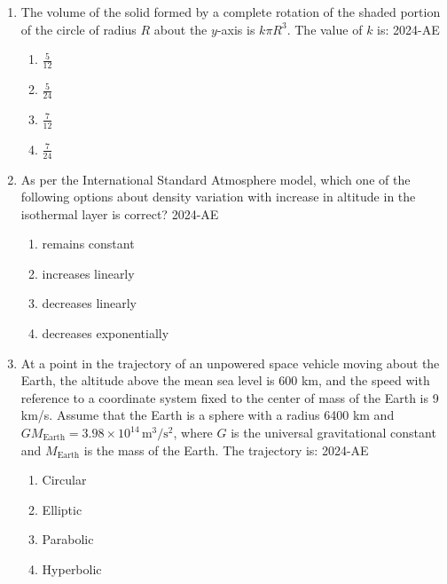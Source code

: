 \documentclass[journal]{IEEEtran}
\begin{document}
\begin{enumerate}
    \item The volume of the solid formed by a complete rotation of the shaded portion of the circle of radius $R$ about the $y$-axis is $k \pi R^3$. The value of $k$ is:
     \hfill{2024-AE}
    \begin{enumerate}
        \item $\frac{5}{12}$
        \item $\frac{5}{24}$
        \item $\frac{7}{12}$
        \item $\frac{7}{24}$
    \end{enumerate}
     \item As per the International Standard Atmosphere model, which one of the following options about density variation with increase in altitude in the isothermal layer is correct?
      \hfill{2024-AE}
    \begin{enumerate}
        \item remains constant
        \item increases linearly
        \item decreases linearly
        \item decreases exponentially
    \end{enumerate}

\item At a point in the trajectory of an unpowered space vehicle moving about the Earth, the altitude above the mean sea level is 600 km, and the speed with reference to a coordinate system fixed to the center of mass of the Earth is 9 km/s. Assume that the Earth is a sphere with a radius 6400 km and $GM_{\text{Earth}} = 3.98 \times 10^{14} \, \text{m}^3/\text{s}^2$, where $G$ is the universal gravitational constant and $M_{\text{Earth}}$ is the mass of the Earth. The trajectory is:
 \hfill{2024-AE}
    \begin{enumerate}
        \item Circular
        \item Elliptic
        \item Parabolic
        \item Hyperbolic
    \end{enumerate}

\end{enumerate}
\end{document}
